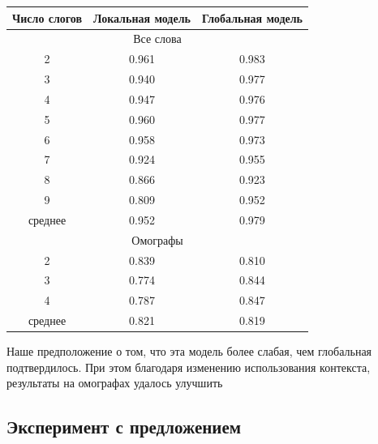 \documentclass[14pt, a4paper, russian]{report}
\begin{document}
\begin{normalsize}
\begin{table}[H]
	\begin{small}
		\begin{center}
			\begin{tabular}{|c|c|c|}
				\hline
				Число слогов & Локальная модель & Глобальная модель \\ \hline
				\multicolumn{3}{|c|}{Все слова}                     \\ \hline
				     2       &      0.961       &       0.983       \\ \hline
				     3       &      0.940       &       0.977       \\ \hline
				     4       &      0.947       &       0.976       \\ \hline
				     5       &      0.960       &       0.977       \\ \hline
				     6       &      0.958       &       0.973       \\ \hline
				     7       &      0.924       &       0.955       \\ \hline
				     8       &      0.866       &       0.923       \\ \hline
				     9       &      0.809       &       0.952       \\ \hline
				  среднее    &      0.952       &       0.979       \\ \hline
				\multicolumn{3}{|c|}{Омографы}                      \\ \hline
				     2       &      0.839       &       0.810       \\ \hline
				     3       &      0.774       &       0.844       \\ \hline
				     4       &      0.787       &       0.847       \\ \hline
				  среднее    &      0.821       &       0.819       \\ \hline
			\end{tabular}
		\end{center}
	\end{small}
	\label{table:local_char}
\end{table}	

Наше предположение о том, что эта модель более слабая, чем глобальная подтвердилось. При этом благодаря изменению использования контекста, результаты на омографах удалось улучшить

\subsection{Эксперимент с предложением}


\end{normalsize}
\end{document}
